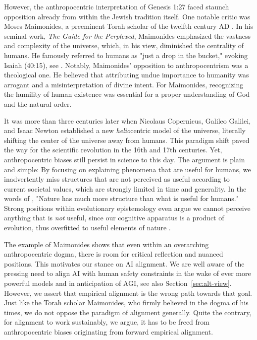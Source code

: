 \documentclass{article}
\theoremstyle{plain}
\theoremstyle{definition}
\theoremstyle{remark}
\begin{document}
However, the anthropocentric interpretation of Genesis 1:27 faced staunch opposition already from within the Jewish tradition itself. One notable critic was Moses Maimonides, a preeminent Torah scholar of the twelfth century AD \cite{lamm1965man,shapiro2003limits}. %
In his seminal work, \textit{The Guide for the Perplexed}, Maimonides emphasized the vastness and complexity of the universe, which, in his view, diminished the centrality of humans. He famously referred to humans as "just a drop in the bucket," evoking Isaiah (40:15), see \citet{dan1989studies}.
Notably, Maimonides' opposition to anthropocentrism was a theological one. He believed that attributing undue importance to humanity was arrogant and a misinterpretation of divine intent. For Maimonides, recognizing the humility of human existence was essential for a proper understanding of God and the natural order. 
%

It was more than three centuries later when Nicolaus Copernicus, Galileo Galilei, and Isaac Newton established a new \textit{helio}centric model of the universe, literally shifting the center of the universe away from humans. This paradigm shift \cite{kuhn1997structure} paved the way for the scientific revolution in the 16th and 17th centuries. 
Yet, anthropocentric biases still persist in science to this day. The argument is plain and simple: By focusing on explaining phenomena that are useful for humans, we inadvertently miss structures that are not perceived as useful according to current societal values, which are strongly limited in time and generality. In the words of \citet{petersgresham}, "Nature has much more structure than what is useful for humans." Strong positions within evolutionary epistemology even argue we cannot perceive anything that is \textit{not} useful, since our cognitive apparatus is a product of evolution, thus overfitted to useful elements of nature \citep{Lorenz:Mirror,Wuketits:1990}. 

The example of Maimonides shows that even within an overarching anthropocentric dogma, there is room for critical reflection and nuanced positions. 
This motivates our stance on AI alignment. We are well aware of the pressing need to align AI with human safety constraints in the wake of ever more powerful models and in anticipation of AGI, see also Section~\ref{sec:alt-view}. However, we assert that empirical alignment is the wrong path towards that goal.
%
Just like the Torah scholar Maimonides, who firmly believed in the dogma of his times, we do not oppose the paradigm of alignment generally. Quite the contrary, for alignment to work sustainably, we argue, it has to be freed from anthropocentric biases originating from forward empirical alignment.  
\end{document}
